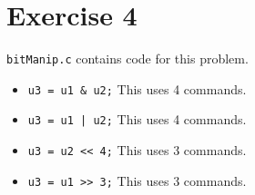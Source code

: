 \documentclass[12pt]{article}
\begin{document}
\section*{Exercise 4}
\verb|bitManip.c| contains code for this problem.
\begin{itemize}
    \item 
    \verb|u3 = u1 & u2;|
    This uses 4 commands.

    \item 
    \verb<u3 = u1 | u2;<
    This uses 4 commands.

    \item 
    \verb|u3 = u2 << 4;|
    This uses 3 commands.

    \item 
    \verb|u3 = u1 >> 3;|
    This uses 3 commands.

\end{itemize}
\end{document}
